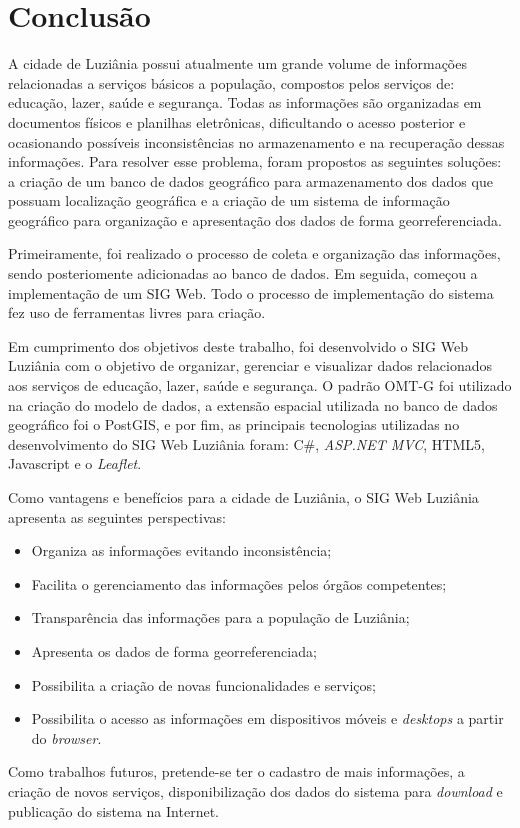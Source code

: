 \chapter{Conclusão}
\label{cap:conclusao}

A cidade de Luziânia possui atualmente um grande volume de informações relacionadas a serviços básicos a população, compostos pelos serviços de: educação, lazer, saúde e segurança. Todas as informações são organizadas em documentos físicos e planilhas eletrônicas, dificultando o acesso posterior e ocasionando possíveis inconsistências no armazenamento e na recuperação dessas informações. Para resolver esse problema, foram propostos as seguintes soluções: a criação de um banco de dados geográfico para armazenamento dos dados que possuam localização geográfica e a criação de um sistema de informação geográfico para organização e apresentação dos dados de forma georreferenciada.

Primeiramente, foi realizado o processo de coleta e organização das informações, sendo posteriomente adicionadas ao banco de dados. Em seguida, começou a implementação de um SIG Web. Todo o processo de implementação do sistema fez uso de ferramentas livres para criação.

Em cumprimento dos objetivos deste trabalho, foi desenvolvido o SIG Web Luziânia com o objetivo de organizar, gerenciar e visualizar dados relacionados aos serviços de educação, lazer, saúde e segurança. O padrão OMT-G foi utilizado na criação do modelo de dados, a extensão espacial utilizada no banco de dados geográfico foi o PostGIS, e por fim, as principais tecnologias utilizadas no desenvolvimento do SIG Web Luziânia foram: C\#, \textit{ASP.NET MVC}, HTML5, Javascript e o \textit{Leaflet}.

Como vantagens e benefícios para a cidade de Luziânia, o SIG Web Luziânia apresenta as seguintes perspectivas:

\begin{itemize}
\item Organiza as informações evitando inconsistência;
\item Facilita o gerenciamento das informações pelos órgãos competentes;
\item Transparência das informações para a população de Luziânia; 
\item Apresenta os dados de forma georreferenciada;
\item Possibilita a criação de novas funcionalidades e serviços;
\item Possibilita o acesso as informações em dispositivos móveis e \textit{desktops} a partir do \textit{browser}.
\end{itemize}

Como trabalhos futuros, pretende-se ter o cadastro de mais informações, a criação de novos serviços, disponibilização dos dados do sistema para \textit{download} e publicação do sistema na Internet.